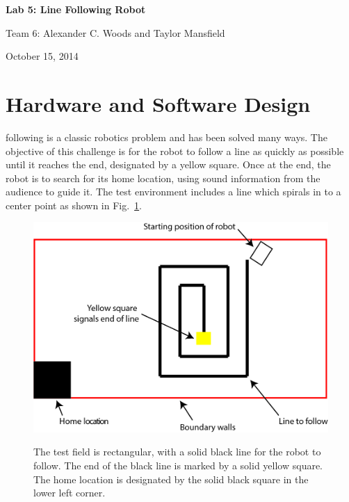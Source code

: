 \documentclass[journal]{../IEEEtran}
\begin{document}
\begin{titlepage}
    \vspace*{\fill}
    \begin{center}
      {\LARGE \bf Lab 5: Line Following Robot}

      {Team 6: Alexander  C. Woods and Taylor Mansfield}

      October 15, 2014
    \end{center}
    \vspace*{\fill}
  \end{titlepage}


\section{Hardware and Software Design}\label{S.design}
 following is a classic robotics problem and has been solved many ways. The objective of this challenge is for the robot to follow a line as quickly as possible until it reaches the end, designated by a yellow square. Once at the end, the robot is to search for its home location, using sound information from the audience to guide it. The test environment includes a line which spirals in to a center point as shown in Fig.~\ref{F.field}.

\begin{figure}[ht]
 \centering
  \includegraphics[width=1\columnwidth]{field.jpg}\\
  \caption{The test field is rectangular, with a solid black line for the robot to follow. The end of the black line is marked by a solid yellow square. The home location is designated by the solid black square in the lower left corner.}
  \label{F.field}
\end{figure}
\end{document}
